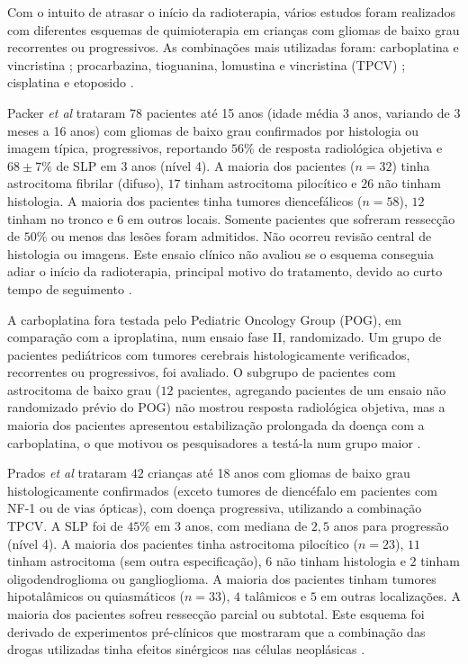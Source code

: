 \documentclass[11pt,a4paper,oldfontcommands]{memoir}
\begin{document}
Com o intuito de atrasar o início da radioterapia, vários estudos foram realizados com diferentes esquemas de quimioterapia em crianças com gliomas de baixo grau recorrentes ou progressivos. As combinações mais utilizadas foram: carboplatina e vincristina \cite{packer,gnekow}; procarbazina, tioguanina, lomustina e vincristina (TPCV) \cite{prados}; cisplatina e etoposido \cite{mass}.

Packer \textit{et al} trataram \(78\) pacientes até 15 anos (idade média 3 anos, variando de 3 meses a 16 anos) com gliomas de baixo grau confirmados por histologia ou imagem típica, progressivos, reportando \(56\%\) de resposta radiológica objetiva e \(68 \pm 7\%\) de SLP em 3 anos (nível 4). A maioria dos pacientes (\(n=32\)) tinha astrocitoma fibrilar (difuso), \(17\) tinham astrocitoma pilocítico e \(26\) não tinham histologia. A maioria dos pacientes tinha tumores diencefálicos (\(n=58\)), \(12\) tinham no tronco e \(6\) em outros locais. Somente pacientes que sofreram ressecção de \(50\%\) ou menos das lesões foram admitidos. Não ocorreu revisão central de histologia ou imagens. Este ensaio clínico não avaliou se o esquema conseguia adiar o início da radioterapia, principal motivo do tratamento, devido ao curto tempo de seguimento \cite{packer}. 

A carboplatina fora testada pelo Pediatric Oncology Group (POG), em comparação com a iproplatina, num ensaio fase II, randomizado. Um grupo de pacientes pediátricos com tumores cerebrais histologicamente verificados, recorrentes ou progressivos, foi avaliado. O subgrupo de pacientes com astrocitoma de baixo grau (\(12\) pacientes, agregando pacientes de um ensaio não randomizado prévio do POG) não mostrou resposta radiológica objetiva, mas a maioria dos pacientes apresentou estabilização prolongada da doença com a carboplatina, o que motivou os pesquisadores a testá-la num grupo maior \cite{fried}. 

Prados \textit{et al}  trataram \(42\) crianças até 18 anos com gliomas de baixo grau histologicamente confirmados (exceto tumores de diencéfalo em pacientes com NF-1 ou de vias ópticas), com doença progressiva, utilizando a combinação TPCV. A SLP foi de \(45\%\) em 3 anos, com mediana de \(2,5\) anos para progressão (nível 4). A maioria dos pacientes tinha astrocitoma pilocítico (\(n=23\)), \(11\) tinham astrocitoma (sem outra especificação), \(6\) não tinham histologia e \(2\) tinham oligodendroglioma ou ganglioglioma. A maioria dos pacientes tinham tumores hipotalâmicos ou quiasmáticos (\(n=33\)), \(4\) talâmicos e \(5\) em outras localizações. A maioria dos pacientes sofreu ressecção parcial ou subtotal. Este esquema foi derivado de experimentos pré-clínicos que mostraram que a combinação das drogas utilizadas tinha efeitos sinérgicos nas células neoplásicas \cite{prados}. 
\end{document}
